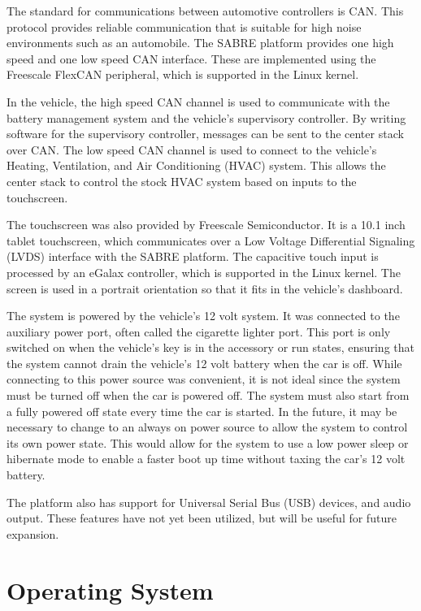 \documentclass[ece]{uw-wkrpt}
\begin{document}
The standard for communications between automotive controllers is CAN. This
protocol provides reliable communication that is suitable for high noise
environments such as an automobile. The SABRE platform provides one high speed
and one low speed CAN interface. These are implemented using the Freescale
FlexCAN peripheral, which is supported in the Linux kernel.

In the vehicle, the high speed CAN channel is used to communicate with the
battery management system and the vehicle's supervisory controller. By writing
software for the supervisory controller, messages can be sent to the center
stack over CAN. The low speed CAN channel is used to connect to the vehicle's
Heating, Ventilation, and Air Conditioning (HVAC) system. This allows the center
stack to control the stock HVAC system based on inputs to the touchscreen.

The touchscreen was also provided by Freescale Semiconductor. It is a 10.1 inch
tablet touchscreen, which communicates over a Low Voltage Differential Signaling
(LVDS) interface with the SABRE platform. The capacitive touch input is
processed by an eGalax controller, which is supported in the Linux kernel. The
screen is used in a portrait orientation so that it fits in the vehicle's
dashboard.

The system is powered by the vehicle's 12 volt system. It was connected to the
auxiliary power port, often called the cigarette lighter port. This port is
only switched on when the vehicle's key is in the accessory or run states,
ensuring that the system cannot drain the vehicle's 12 volt battery when the car
is off. While connecting to this power source was convenient, it is not ideal
since the system must be turned off when the car is powered off. The system must
also start from a fully powered off state every time the car is started. In the
future, it may be necessary to change to an always on power source to allow the 
system to control its own power state. This would allow for the system to use a 
low power sleep or hibernate mode to enable a faster boot up time without taxing 
the car's 12 volt battery.

The platform also has support for Universal Serial Bus (USB) devices, and audio
output. These features have not yet been utilized, but will be useful for future
expansion.

\section{Operating System}
\end{document}
